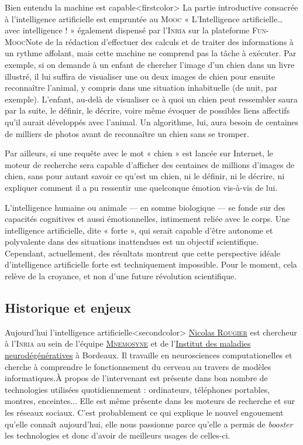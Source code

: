 Bien entendu la machine est capable\caution[t]<firstcolor>{%
La partie introductive consacrée à l'intelligence artificielle est empruntée au \textsc{Mooc} « L'Intelligence artificielle… avec intelligence ! » également dispensé par l'\textsc{Inria} sur la plateforme \textsc{Fun-Mooc}}{Note de la rédaction}
 d’effectuer des calculs et de traiter des informations à un rythme affolant, mais cette machine ne comprend pas la tâche à exécuter. Par exemple, si on demande à un enfant de chercher l’image d’un chien dans un livre illustré, il lui suffira de visualiser une ou deux images de chien pour ensuite reconnaître l’animal, y compris dans une situation inhabituelle (de nuit, par exemple). L’enfant, au-delà de visualiser ce à quoi un chien peut ressembler saura par la suite, le définir, le décrire, voire même évoquer de possibles liens affectifs qu’il aurait développés avec l’animal. Un algorithme, lui, aura besoin de centaines de milliers de photos avant de reconnaître un chien sans se tromper. 

Par ailleurs, si une requête avec le mot « chien » est lancée sur Internet, le moteur de recherche sera capable d’afficher des centaines de millions d’images de chien, sans pour autant savoir ce qu’est un chien, ni le définir, ni le décrire, ni expliquer comment il a pu ressentir une quelconque émotion vis-à-vis de lui.

L’intelligence humaine ou animale --- en somme biologique --- se fonde sur des capacités cognitives et aussi émotionnelles, intimement reliée avec le corps. Une intelligence artificielle, dite « forte », qui serait capable d’être autonome et polyvalente dans des situations inattendues est un objectif scientifique. Cependant, actuellement, des résultats montrent que cette perspective idéale d'intelligence artificielle forte est techniquement impossible. Pour le moment, cela relève de la croyance, et non d’une future révolution scientifique.


\subsection[Historique et enjeux]{Historique et enjeux}
\label{sub:III.1.1}

Aujourd’hui l'intelligence artificielle\caution[t]<secondcolor>{%
\href{https://www.labri.fr/perso/nrougier/}{Nicolas \textsc{Rougier}} est chercheur à l'\textsc{Inria} au sein de l'équipe \href{https://team.inria.fr/mnemosyne/fr/}{\textsc{Mnemosyne}} et de l'\href{http://www.imn-bordeaux.org/}{Institut des maladies neurodégénératives} à Bordeaux. Il travaille en neurosciences computationelles et cherche à comprendre le fonctionnement du cerveau au travers de modèles informatiques.}{À propos de l'intervenant}
 est présente dans bon nombre de technologies utilisées quotidiennement : ordinateurs, téléphones portables, montres, enceintes... Elle est même présente dans les moteurs de recherche et sur les réseaux sociaux. C’est probablement ce qui explique le nouvel engouement qu’elle connaît aujourd’hui, elle nous passionne parce qu’elle a permis de \textit{booster} les technologies et donc d’avoir de meilleurs usages de celles-ci. 

